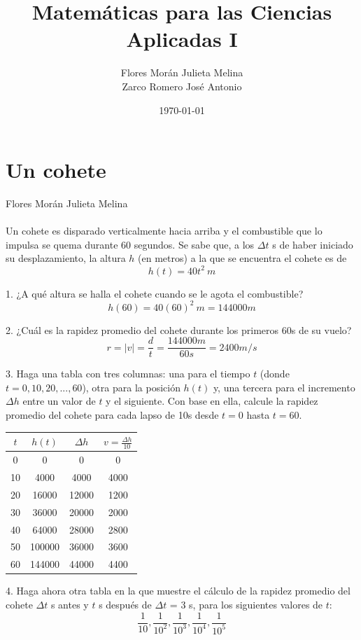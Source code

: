 \documentclass[12pt]{article}
\title{Matemáticas para las Ciencias Aplicadas I}
\date{\today}
\author{Flores Morán Julieta Melina \\ Zarco Romero José Antonio}
\begin{document}
\maketitle

\section{Un cohete}
Flores Morán Julieta Melina \\
\\
Un cohete es disparado verticalmente hacia arriba y el combustible que lo impulsa se quema durante 60 segundos. Se sabe que, a los $\Delta t$ s de haber iniciado su desplazamiento, la altura $h$ (en metros) a la que se encuentra el cohete es de 
\[h (t) = 40 t^2 ~ m\]

1. ¿A qué altura se halla el cohete cuando se le agota el combustible?
\[h (60) = 40 (60)^2 ~ m = 144000m\]

2. ¿Cuál es la rapidez promedio del cohete durante los primeros 60s de su vuelo?
\[
r = |v| = \frac{d}{t} = \frac{ 144000m}{60s} =  2400 m/s
\]

3. Haga una tabla con tres columnas: una para el tiempo $t$ (donde $t = 0, 10, 20, . . . , 60$), otra para la posición $h(t)$ y, una tercera para el incremento $\Delta h$ entre un valor de $t$ y el siguiente. Con base en ella, calcule la rapidez promedio del cohete para cada lapso de 10s desde $t = 0$ hasta $t = 60$.\\

\begin{center}
\begin{tabular}{||c c c c||} 
 \hline
 $t$ & $h(t)$ &  $\Delta h$  & $v =\frac{\Delta h}{10}$ \\ [0.5ex] 
 \hline\hline
 0	& 0 & 0 & 0\\
10 & 	4000 &	4000 &	4000 \\
20	& 16000 &	12000	& 1200 \\
30 & 	36000	& 20000	& 2000 \\
40 & 	64000	& 28000 &	2800 \\
50	& 100000 & 	36000 &	3600 \\
60 & 	144000	& 44000	& 4400 \\ [1ex] 
\hline
\end{tabular}
\end{center}

4. Haga ahora otra tabla en la que muestre el cálculo de la rapidez promedio del cohete $\Delta t$ s antes y $t$ s después de $\Delta t $ = 3 s, para los siguientes valores de $t$:
\[
\frac{1}{10},\frac{1}{10 ^ 2} , \frac{1}{10 ^ 3}, \frac{1}{10 ^ 4}, \frac{1}{10 ^ 5}
\]
\end{document}
